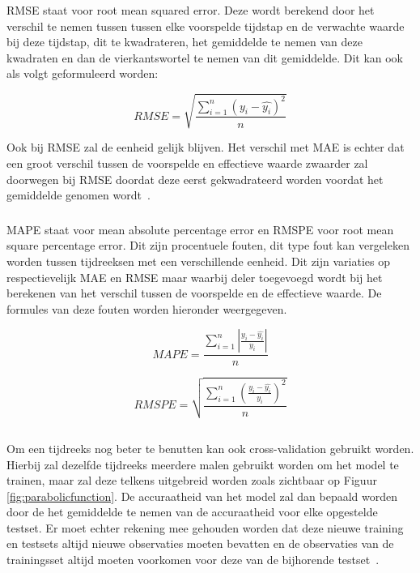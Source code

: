 \subsubsection{}

RMSE staat voor root mean squared error. Deze wordt berekend door het verschil te nemen tussen tussen elke voorspelde tijdstap en de verwachte waarde bij deze tijdstap, dit te kwadrateren, het gemiddelde te nemen van deze kwadraten en dan de vierkantswortel te nemen van dit gemiddelde.
Dit kan ook als volgt geformuleerd worden:

\begin{equation}
RMSE = \sqrt{\frac{\sum_{i=1}^{n} (y_i - \hat{y_i})^2}{n}}
\end{equation}

Ook bij RMSE zal de eenheid gelijk blijven. Het verschil met MAE is echter dat een groot verschil tussen de voorspelde en effectieve waarde zwaarder zal doorwegen bij RMSE doordat deze eerst gekwadrateerd worden voordat het gemiddelde genomen wordt~\autocite{Kampakis2020}.

\subsubsection{}

MAPE staat voor mean absolute percentage error en RMSPE voor root mean square percentage error. Dit zijn procentuele fouten, dit type fout kan vergeleken worden tussen tijdreeksen met een verschillende eenheid. Dit zijn variaties op respectievelijk MAE en RMSE maar waarbij deler toegevoegd wordt bij het berekenen van het verschil tussen de voorspelde en de effectieve waarde. De formules van deze fouten worden hieronder weergegeven.

\begin{equation}
MAPE = \frac{\sum_{i=1}^{n} |\frac{y_i - \hat{y_i}}{y_i}|}{n}
\end{equation}

\begin{equation}
RMSPE = \sqrt{\frac{\sum_{i=1}^{n} (\frac{y_i - \hat{y_i}}{y_i})^2}{n}}
\end{equation}

\subsection{}

Om een tijdreeks nog beter te benutten kan ook cross-validation gebruikt worden. Hierbij zal dezelfde tijdreeks meerdere malen gebruikt worden om het model te trainen, maar zal deze telkens uitgebreid worden zoals zichtbaar op Figuur \ref{fig:parabolicfunction}. De accuraatheid van het model zal dan bepaald worden door de het gemiddelde te nemen van de accuraatheid voor elke opgestelde testset. Er moet echter rekening mee gehouden worden dat deze nieuwe training en testsets altijd nieuwe observaties moeten bevatten en de observaties van de trainingsset altijd moeten voorkomen voor deze van de bijhorende testset~\autocite{Shrivastava2020}.


